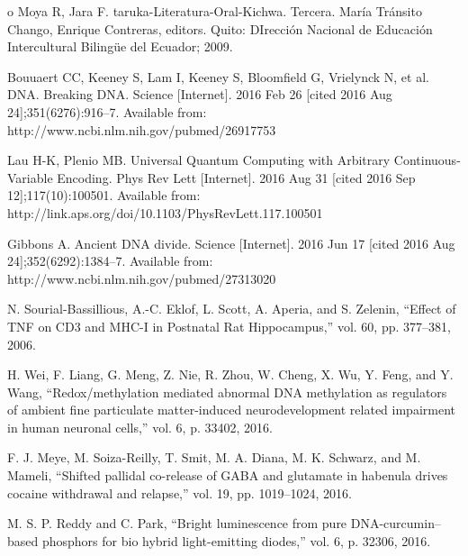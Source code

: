 \documentclass[11pt,a4paper]{article}
\begin{document}
\begin{thebibliography}{o}
 Moya R, Jara F. taruka-Literatura-Oral-Kichwa. Tercera. María Tránsito Chango, Enrique Contreras, editors. Quito: DIrección Nacional de Educación Intercultural Bilingüe del Ecuador; 2009. 

 Bouuaert CC, Keeney S, Lam I, Keeney S, Bloomfield G, Vrielynck N, et al. DNA. Breaking DNA. Science [Internet]. 2016 Feb 26 [cited 2016 Aug 24];351(6276):916–7. Available from: http://www.ncbi.nlm.nih.gov/pubmed/26917753

 Lau H-K, Plenio MB. Universal Quantum Computing with Arbitrary Continuous-Variable Encoding. Phys Rev Lett [Internet]. 2016 Aug 31 [cited 2016 Sep 12];117(10):100501. Available from: http://link.aps.org/doi/10.1103/PhysRevLett.117.100501

 Gibbons A. Ancient DNA divide. Science [Internet]. 2016 Jun 17 [cited 2016 Aug 24];352(6292):1384–7. Available from: http://www.ncbi.nlm.nih.gov/pubmed/27313020

 N. Sourial-Bassillious, A.-C. Eklof, L. Scott, A. Aperia, and S. Zelenin, ``Effect of TNF on CD3 and MHC-I in Postnatal Rat Hippocampus,” vol. 60, pp. 377–381, 2006.

 H. Wei, F. Liang, G. Meng, Z. Nie, R. Zhou, W. Cheng, X. Wu, Y. Feng, and Y. Wang, ``Redox/methylation mediated abnormal DNA methylation as regulators of ambient fine particulate matter-induced neurodevelopment related impairment in human neuronal cells,” vol. 6, p. 33402, 2016.

 F. J. Meye, M. Soiza-Reilly, T. Smit, M. A. Diana, M. K. Schwarz, and M. Mameli, ``Shifted pallidal co-release of GABA and glutamate in habenula drives cocaine withdrawal and relapse,” vol. 19, pp. 1019–1024, 2016.

 M. S. P. Reddy and C. Park, ``Bright luminescence from pure DNA-curcumin–based phosphors for bio hybrid light-emitting diodes,” vol. 6, p. 32306, 2016.


 
\end{thebibliography}
\end{document}
